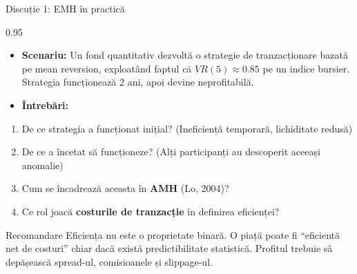 \documentclass[9pt, aspectratio=169, t]{beamer}
\begin{document}
\begin{frame}{Discuție 1: EMH în practică}
\begin{cminipage}{0.95\textwidth}
    \begin{itemize}\setlength{\itemsep}{0pt}
        \item \textbf{Scenariu:} Un fond quantitativ dezvoltă o strategie de tranzacționare bazată pe mean reversion, exploatând faptul că $VR(5) \approx 0.85$ pe un indice bursier. Strategia funcționează 2 ani, apoi devine neprofitabilă.
        \item \textbf{Întrebări:}
    \end{itemize}
    \begin{enumerate}\setlength{\itemsep}{0pt}
        \item De ce strategia a funcționat inițial? (Ineficiență temporară, lichiditate redusă)
        \item De ce a încetat să funcționeze? (Alți participanți au descoperit aceeași anomalie)
        \item Cum se încadrează aceasta în \textbf{AMH} (Lo, 2004)?
        \item Ce rol joacă \textbf{costurile de tranzacție} în definirea eficienței?
    \end{enumerate}

    \vspace{0.2cm}
    \begin{block}{Recomandare}
        {\small Eficiența nu este o proprietate binară. O piață poate fi ``eficientă net de costuri'' chiar dacă există predictibilitate statistică. Profitul trebuie să depășească spread-ul, comisioanele și slippage-ul.}
    \end{block}
\end{cminipage}
\end{frame}
\end{document}
